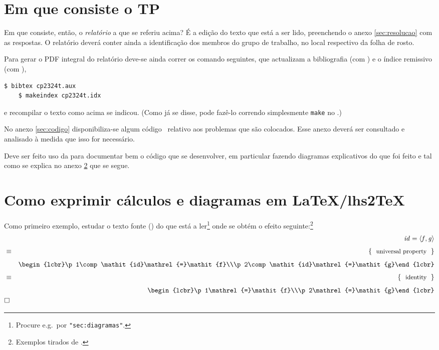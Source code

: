 \documentclass[11pt, a4paper, fleqn]{article}
\newcommand{\Varid}[1]{\mathit{#1}}
\begin{document}
\section{Em que consiste o TP}

Em que consiste, então, o \emph{relatório} a que se referiu acima?
É a edição do texto que está a ser lido, preenchendo o anexo \ref{sec:resolucao}
com as respostas. O relatório deverá conter ainda a identificação dos membros
do grupo de trabalho, no local respectivo da folha de rosto.

Para gerar o PDF integral do relatório deve-se ainda correr os comando seguintes,
que actualizam a bibliografia (com \Bibtex) e o índice remissivo (com \Makeindex),
\begin{Verbatim}[fontsize=\small]
    $ bibtex cp2324t.aux
    $ makeindex cp2324t.idx
\end{Verbatim}
e recompilar o texto como acima se indicou. (Como já se disse, pode fazê-lo
correndo simplesmente \texttt{make} no \container.)

No anexo \ref{sec:codigo} disponibiliza-se algum código \Haskell\ relativo
aos problemas que são colocados. Esse anexo deverá ser consultado e analisado
à medida que isso for necessário.

Deve ser feito uso da  para documentar bem o código que se
desenvolver, em particular fazendo diagramas explicativos do que foi feito e
tal como se explica no anexo \ref{sec:diagramas} que se segue.

\section{Como exprimir cálculos e diagramas em LaTeX/lhs2TeX} \label{sec:diagramas}

Como primeiro exemplo, estudar o texto fonte () do que está a ler\footnote{
Procure e.g.\ por \texttt{"sec:diagramas"}.} onde se obtém o efeito seguinte:\footnote{Exemplos
tirados de \cite{Ol18}.}
\begin{eqnarray*}
\start
\ensuremath{\Varid{id}\mathrel{=}\conj{\Varid{f}}{\Varid{g}}}
\just\equiv{ universal property }
\ensuremath{\begin{lcbr}\p1\comp \Varid{id}\mathrel{=}\Varid{f}\\\p2\comp \Varid{id}\mathrel{=}\Varid{g}\end{lcbr}}
\just\equiv{ identity }
\ensuremath{\begin{lcbr}\p1\mathrel{=}\Varid{f}\\\p2\mathrel{=}\Varid{g}\end{lcbr}}
\qed
\end{eqnarray*}
\end{document}
